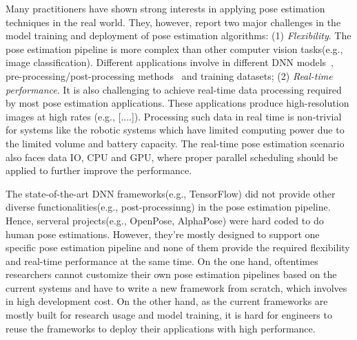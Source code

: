 \documentclass[twoside,11pt]{article}
\begin{document}
Many practitioners have shown strong interests in applying 
pose estimation techniques in the real world. 
They, however, report two major challenges in the model training and deployment of pose estimation algorithms: (1) \emph{Flexibility}.
The pose estimation pipeline is more complex than other computer vision tasks(e.g., image classification). Different applications involve in different DNN models~\citep{x1, x2, x3}, pre-processing/post-processing methods~\citep{x1, x2, x3} and training datasets\citep{x1, x2, x3};
(2) \emph{Real-time performance}. It is also challenging to achieve real-time data processing required by most pose estimation applications. These applications produce high-resolution images at high rates (e.g., [....]). Processing such data in real time is non-trivial for systems like the robotic systems which have limited computing power due to the limited volume and battery capacity. The real-time pose estimation scenario also faces data IO, CPU and GPU, where proper parallel scheduling should be applied to further improve the performance.

The state-of-the-art DNN frameworks(e.g., TensorFlow\citep{x}) did not provide other diverse functionalities(e.g., post-processinng) in the pose estimation pipeline. Hence, serveral projects(e.g., OpenPose\citep{x}, AlphaPose\citep{x}) were hard coded to do human pose estimations. However, they're mostly designed to support one specific pose estimation pipeline and none of them provide the required flexibility and real-time performance at the same time. 
On the one hand, oftentimes researchers cannot customize their own pose estimation pipelines based on the current systems and have to write a new framework from scratch, which involves in high development cost. On the other hand, as the current frameworks are mostly built for research usage and model training, it is hard for engineers to reuse the frameworks to deploy their applications with high performance.

\end{document}
